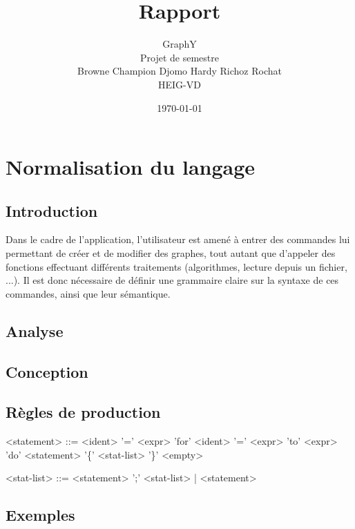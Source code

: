 \documentclass[french]{article}
\begin{document}
	\title{Rapport}
	\author{GraphY\\ %
		Projet de semestre\\
		Browne Champion Djomo Hardy Richoz Rochat\\
		HEIG-VD}
	\date{\today} %
	\maketitle
	
	\tableofcontents
	
	\justify
	\normalsize
	
	\section{Normalisation du langage} %
		\subsection{Introduction} %
			Dans le cadre de l'application, l'utilisateur est amené à entrer des commandes lui permettant de créer et de modifier des graphes, tout autant que d'appeler des fonctions effectuant différents traitements (algorithmes, lecture depuis un fichier, ...). Il est donc nécessaire de définir une grammaire claire sur la syntaxe de ces commandes, ainsi que leur sémantique.
			
		\subsection{Analyse} %
			
		\subsection{Conception} %
			
		\subsection{Règles de production} %
			
			\begin{grammar}
				<statement> ::= <ident> '=' <expr>
				\alt 'for' <ident> '=' <expr> 'to' <expr> 'do' <statement>
				\alt '\{' <stat-list> '\}'
				\alt <empty>
				
				<stat-list> ::= <statement> ';' <stat-list> | <statement>
			\end{grammar}
		
		\subsection{Exemples} %
				
\end{document}
